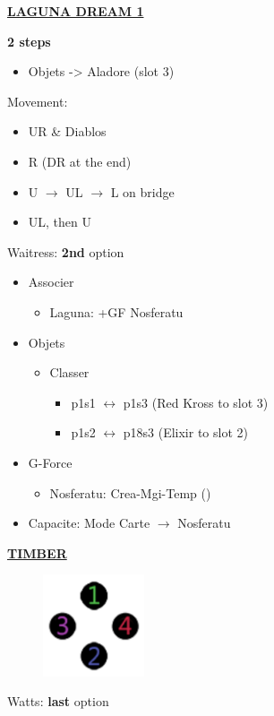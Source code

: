\underline{\textbf{LAGUNA DREAM 1}}

\textbf{2 steps}

\begin{menu}
	\begin{itemize}
		\item Objets -> Aladore (slot 3)
	\end{itemize}
\end{menu}

Movement:
\begin{itemize}
	\item UR \& Diablos
	\item R (DR at the end)
	\item U $\rightarrow$ UL $\rightarrow$ L on bridge
	\item UL, then U
\end{itemize}

Waitress: \textbf{2nd} option

\begin{menu}[18s]
	\begin{itemize}
		\item Associer
			\begin{itemize}
				\item Laguna: +GF Nosferatu
			\end{itemize}
		\item Objets
			\begin{itemize}
				\item Classer
					\begin{itemize}
						\item p1s1 $\leftrightarrow$ p1s3 (Red Kross to slot 3)
						\item p1s2 $\leftrightarrow$ p18s3 (Elixir to slot 2)
					\end{itemize}
			\end{itemize}
		\item G-Force
			\begin{itemize}
				\item Nosferatu: Crea-Mgi-Temp ()
			\end{itemize}
		\item Capacite: Mode Carte $\rightarrow$ Nosferatu
	\end{itemize}
\end{menu}

\underline{\textbf{TIMBER}}

\begin{figure}
\includegraphics[width=3cm]{Images/train_codes.png}
\end{figure}
Watts: \textbf{last} option

